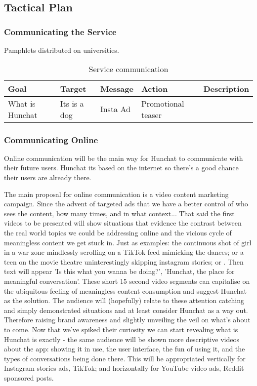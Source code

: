 \documentclass[12pt]{article}
\begin{document}
\subsection{Tactical Plan}
	\subsubsection{Communicating the Service}
	
	Pamphlets distributed on universities.
	\begin{table}[htbp]
	\small
	\caption{Service communication}
	\label{table:service}
	\centering
	\begin{tabular}{ @{}P{0.18\textwidth}P{0.18\textwidth}P{0.18\textwidth}P{0.18\textwidth}P{0.18\textwidth}@{} }
Goal	&	Target	&	Message	&	Action	&	Description	 \\ \hline
What is Hunchat	&	Its is a dog&	Insta Ad	& 	Promotional teaser
	 \\ \hline
	\end{tabular}
	\end{table}

	\subsubsection{Communicating Online}
	
	Online communication will be the main way for Hunchat to communicate with their future users. Hunchat its based on the internet so there's a good chance their users are already there.
	
	The main proposal for online communication is a video content marketing campaign. Since the advent of targeted ads that we have a better control of who sees the content, how many times, and in what context... That said the first videos to be presented will show situations that evidence the contrast between the real world topics we could be addressing online and the vicious cycle of meaningless content we get stuck in. Just as examples: the continuous shot of girl in a war zone mindlessly scrolling on a TikTok feed mimicking the dances; or a teen on the movie theatre uninterestingly skipping instagram stories; or  . Then text will appear 'Is this what you wanna be doing?', 'Hunchat, the place for meaningful conversation'. These short 15 second video segments can capitalise on the ubiquitous feeling of meaningless content consumption and suggest Hunchat as the solution. The audience will (hopefully) relate to these attention catching and simply demonstrated situations and at least consider Hunchat as a way out. Therefore raising brand awareness and slightly unveiling the veil on what's about to come. Now that we've spiked their curiosity we can start revealing what is Hunchat is exactly - the same audience will be shown more descriptive videos about the app: showing it in use, the user interface, the fun of using it, and the types of conversations being done there. This will be appropriated vertically for Instagram stories ads, TikTok; and horizontally for YouTube video ads, Reddit sponsored posts.
	
\end{document}
